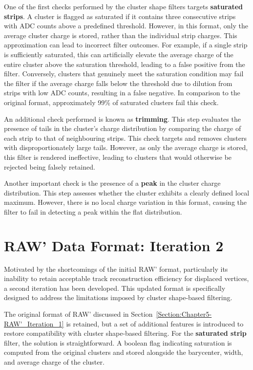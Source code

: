 One of the first checks performed by the cluster shape filters targets \textbf{saturated strips}. A cluster is flagged as saturated if it contains three consecutive strips with ADC counts above a predefined threshold. However, in this format, only the average cluster charge is stored, rather than the individual strip charges. This approximation can lead to incorrect filter outcomes. For example, if a single strip is sufficiently saturated, this can artificially elevate the average charge of the entire cluster above the saturation threshold, leading to a false positive from the filter. Conversely, clusters that genuinely meet the saturation condition may fail the filter if the average charge falls below the threshold due to dilution from strips with low ADC counts, resulting in a false negative. In comparison to the original format, approximately 99\% of saturated clusters fail this check.

An additional check performed is known as \textbf{trimming}. This step evaluates the presence of tails in the cluster's charge distribution by comparing the charge of each strip to that of neighbouring strips.  This check targets and removes clusters with disproportionately large tails. However, as only the average charge is stored, this filter is rendered ineffective, leading to clusters that would otherwise be rejected being falsely retained. 

Another important check is the presence of a \textbf{peak} in the cluster charge distribution. This step assesses whether the cluster exhibits a clearly defined local maximum. However, there is no local charge variation in this format, causing the filter to fail in detecting a peak within the flat distribution.

\section{RAW' Data Format: Iteration 2}

Motivated by the shortcomings of the initial RAW' format, particularly its inability to retain acceptable track reconstruction efficiency for displaced vertices, a second iteration has been developed. This updated format is specifically designed to address the limitations imposed by cluster shape-based filtering.

The original format of RAW' discussed in Section~\ref{Section:Chapter5-RAW'_Iteration_1} is retained, but a set of additional features is introduced to restore compatibility with cluster shape-based filtering. For the \textbf{saturated strip} filter, the solution is straightforward. A boolean flag indicating saturation is computed from the original clusters and stored alongside the barycenter, width, and average charge of the cluster. 

